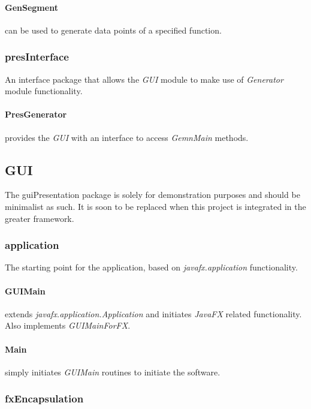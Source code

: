 \documentclass{article}
\begin{document}
  \paragraph{GenSegment} can be used to generate data points of a specified function.
  
  \subsubsection*{presInterface}
  
  An interface package that allows the \textit{GUI} module to make use of \textit{Generator} module functionality.
  
  \paragraph{PresGenerator} provides the \textit{GUI} with an interface to access \textit{GemnMain} methods.
  
  \subsection{GUI}
  
  The guiPresentation package is solely for demonstration purposes and should be minimalist as such. It is soon to be replaced when this project is integrated in the greater framework.
  
  \subsubsection*{application}
  
  The starting point for the application, based on \textit{javafx.application} functionality.
  
  \paragraph{GUIMain} extends \textit{javafx.application.Application} and initiates \textit{JavaFX} related functionality.\\
  Also implements \textit{GUIMainForFX}.
  
  \paragraph{Main} simply initiates \textit{GUIMain} routines to initiate the software.
  
  \subsubsection*{fxEncapsulation}
  
\end{document}
